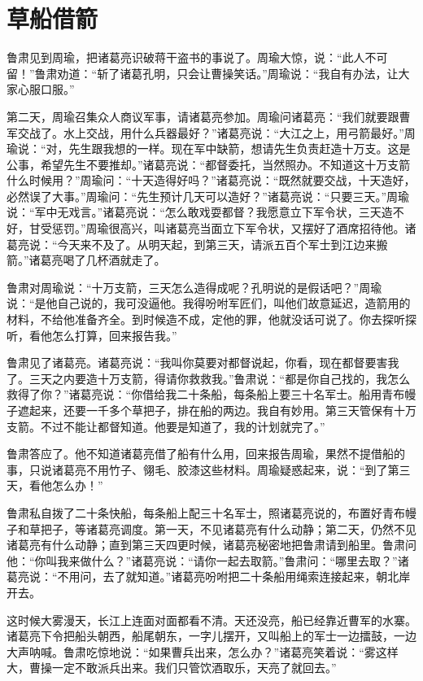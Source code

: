 \documentclass[12pt,UTF-8,openany]{ctexbook}
\begin{document}
\chapter{草船借箭}

\begin{large}
    
    鲁肃见到周瑜，把诸葛亮识破蒋干盗书的事说了。周瑜大惊，说：“此人不可留！”鲁肃劝道：“斩了诸葛孔明，只会让曹操笑话。”周瑜说：“我自有办法，让大家心服口服。”
    
    第二天，周瑜召集众人商议军事，请诸葛亮参加。周瑜问诸葛亮：“我们就要跟曹军交战了。水上交战，用什么兵器最好？”诸葛亮说：“大江之上，用弓箭最好。”周瑜说：“对，先生跟我想的一样。现在军中缺箭，想请先生负责赶造十万支。这是公事，希望先生不要推却。”诸葛亮说：“都督委托，当然照办。不知道这十万支箭什么时候用？”周瑜问：“十天造得好吗？”诸葛亮说：“既然就要交战，十天造好，必然误了大事。”周瑜问：“先生预计几天可以造好？”诸葛亮说：“只要三天。”周瑜说：“军中无戏言。”诸葛亮说：“怎么敢戏耍都督？我愿意立下军令状，三天造不好，甘受惩罚。”周瑜很高兴，叫诸葛亮当面立下军令状，又摆好了酒席招待他。诸葛亮说：“今天来不及了。从明天起，到第三天，请派五百个军士到江边来搬箭。”诸葛亮喝了几杯酒就走了。
    
    鲁肃对周瑜说：“十万支箭，三天怎么造得成呢？孔明说的是假话吧？”周瑜说：“是他自己说的，我可没逼他。我得吩咐军匠们，叫他们故意延迟，造箭用的材料，不给他准备齐全。到时候造不成，定他的罪，他就没话可说了。你去探听探听，看他怎么打算，回来报告我。”
    
    鲁肃见了诸葛亮。诸葛亮说：“我叫你莫要对都督说起，你看，现在都督要害我了。三天之内要造十万支箭，得请你救救我。”鲁肃说：“都是你自己找的，我怎么救得了你？”诸葛亮说：“你借给我二十条船，每条船上要三十名军士。船用青布幔子遮起来，还要一千多个草把子，排在船的两边。我自有妙用。第三天管保有十万支箭。不过不能让都督知道。他要是知道了，我的计划就完了。”
    
    鲁肃答应了。他不知道诸葛亮借了船有什么用，回来报告周瑜，果然不提借船的事，只说诸葛亮不用竹子、翎毛、胶漆这些材料。周瑜疑惑起来，说：“到了第三天，看他怎么办！”
    
    鲁肃私自拨了二十条快船，每条船上配三十名军士，照诸葛亮说的，布置好青布幔子和草把子，等诸葛亮调度。第一天，不见诸葛亮有什么动静；第二天，仍然不见诸葛亮有什么动静；直到第三天四更时候，诸葛亮秘密地把鲁肃请到船里。鲁肃问他：“你叫我来做什么？”诸葛亮说：“请你一起去取箭。”鲁肃问：“哪里去取？”诸葛亮说：“不用问，去了就知道。”诸葛亮吩咐把二十条船用绳索连接起来，朝北岸开去。
    
    这时候大雾漫天，长江上连面对面都看不清。天还没亮，船已经靠近曹军的水寨。诸葛亮下令把船头朝西，船尾朝东，一字儿摆开，又叫船上的军士一边擂鼓，一边大声呐喊。鲁肃吃惊地说：“如果曹兵出来，怎么办？”诸葛亮笑着说：“雾这样大，曹操一定不敢派兵出来。我们只管饮酒取乐，天亮了就回去。”
    

\end{large}
\end{document}
